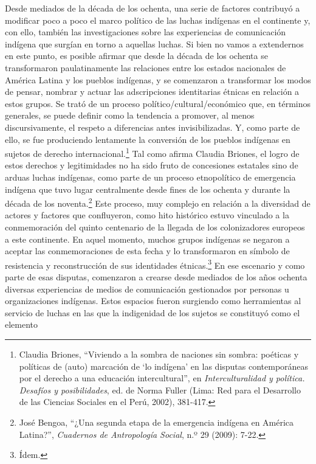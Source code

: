 \documentclass{tufte-handout}
\begin{document}
Desde mediados de la década de los ochenta, una serie de factores
contribuyó a modificar poco a poco el marco político de las luchas
indígenas en el continente y, con ello, también las investigaciones
sobre las experiencias de comunicación indígena que surgían en torno a
aquellas luchas. Si bien no vamos a extendernos en este punto, es
posible afirmar que desde la década de los ochenta se transformaron
paulatinamente las relaciones entre los estados nacionales de América
Latina y los pueblos indígenas, y se comenzaron a transformar los modos
de pensar, nombrar y actuar las adscripciones identitarias étnicas en
relación a estos grupos. Se trató de un proceso
político/cultural/económico que, en términos generales, se puede definir
como la tendencia a promover, al menos discursivamente, el respeto a
diferencias antes invisibilizadas. Y, como parte de ello, se fue
produciendo lentamente la conversión de los pueblos indígenas en sujetos
de derecho internacional.\footnote{Claudia Briones, ``Viviendo a la
  sombra de naciones sin sombra: poéticas y políticas de (auto)
  marcación de `lo indígena' en las disputas contemporáneas por el
  derecho a una educación intercultural'', en \emph{Interculturalidad y
  política. Desafíos y posibilidades}, ed. de Norma Fuller (Lima: Red
  para el Desarrollo de las Ciencias Sociales en el Perú, 2002),
  381-417.} Tal como afirma Claudia Briones, el logro de estos derechos
y legitimidades no ha sido fruto de concesiones estatales sino de arduas
luchas indígenas, como parte de un proceso etnopolítico de emergencia
indígena que tuvo lugar centralmente desde fines de los ochenta y
durante la década de los noventa.\footnote{José Bengoa, ``¿Una segunda
  etapa de la emergencia indígena en América Latina?'', \emph{Cuadernos
  de Antropología Social}, n.º 29 (2009): 7-22.} Este proceso, muy
complejo en relación a la diversidad de actores y factores que
confluyeron, como hito histórico estuvo vinculado a la conmemoración del
quinto centenario de la llegada de los colonizadores europeos a este
continente. En aquel momento, muchos grupos indígenas se negaron a
aceptar las conmemoraciones de esta fecha y lo transformaron en símbolo
de resistencia y reconstrucción de sus identidades étnicas.\footnote{Ídem.}
En ese escenario y como parte de esas disputas, comenzaron a crearse
desde mediados de los años ochenta diversas experiencias de medios de
comunicación gestionados por personas u organizaciones indígenas. Estos
espacios fueron surgiendo como herramientas al servicio de luchas en las
que la indigenidad de los sujetos se constituyó como el elemento
\end{document}
